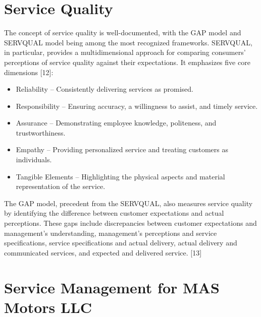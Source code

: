 \section{Service Quality}
The concept of service quality is well-documented, with the GAP model and SERVQUAL model being among the most recognized frameworks. SERVQUAL, in particular, provides a multidimensional approach for comparing consumers’ perceptions of service quality against their expectations. It emphasizes five core dimensions [12]:

\begin{itemize}
    \item Reliability – Consistently delivering services as promised.
    \item Responsibility – Ensuring accuracy, a willingness to assist, and timely service.
    \item Assurance – Demonstrating employee knowledge, politeness, and trustworthiness.
    \item Empathy – Providing personalized service and treating customers as individuals.
    \item Tangible Elements – Highlighting the physical aspects and material representation of the service.
  \end{itemize}

The GAP model, precedent from the SERVQUAL, also measures service quality by identifying the difference between customer expectations and actual perceptions. These gaps include discrepancies between customer expectations and management's understanding, management’s perceptions and service specifications, service specifications and actual delivery, actual delivery and communicated services, and expected and delivered service. [13]

\section{Service Management for MAS Motors LLC}